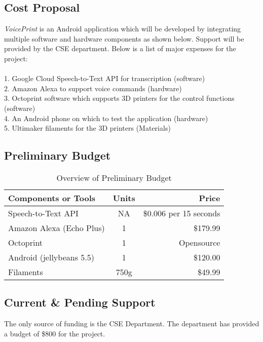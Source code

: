 \subsection{Cost Proposal}
\textit{VoicePrint} is an Android application which will be developed by integrating multiple software and hardware components as shown below. Support will be provided by the CSE department. Below is a list of major expenses for the project:
\\
\\
1. Google Cloud Speech-to-Text API for transcription (software)
\\
2. Amazon Alexa to support voice commands (hardware)
\\
3. Octoprint software which supports 3D printers for the control functions (software)
\\
4. An Android phone on which to test the application (hardware)
\\
5. Ultimaker filaments for the 3D printers (Materials) \\

\subsection{Preliminary Budget}
\begin{table}
    \centering
    \begin{tabular}{|l|c|r|}
    	\hline
        \textbf{Components or Tools} & \textbf{Units} & \textbf{Price} \\
        \hline
	    Speech-to-Text API & NA & \$0.006 per 15 seconds\\
	    \hline
	    Amazon Alexa (Echo Plus) & 1 & \$179.99\\
	    \hline
    	Octoprint & 1 & Opensource\\
    	\hline
	    Android (jellybeans 5.5) & 1 & \$120.00\\
	    \hline
	    Filaments & 750g & \$49.99\\
	    \hline
    \end{tabular}
    \caption{Overview of Preliminary Budget}
\end{table}

\subsection{Current \& Pending Support}
The only source of funding is the CSE Department. The department has provided a budget of \$800 for the project. \\